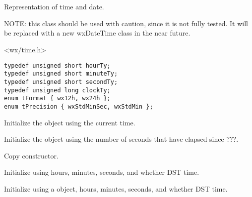 \section{}\label{wxtime}

Representation of time and date.

NOTE: this class should be
used with caution, since it is not fully tested. It will be replaced
with a new wxDateTime class in the near future.




<wx/time.h>


{\small \begin{verbatim}
typedef unsigned short hourTy;
typedef unsigned short minuteTy;
typedef unsigned short secondTy;
typedef unsigned long clockTy;
enum tFormat { wx12h, wx24h };
enum tPrecision { wxStdMinSec, wxStdMin };
\end{verbatim}}




\label{wxtimewxtime}


Initialize the object using the current time.


Initialize the object using the number of seconds that have elapsed since ???.


Copy constructor.


Initialize using hours, minutes, seconds, and whether DST time.


Initialize using a  object, hours, minutes, seconds, and whether DST time.

\label{wxtimegetday}

